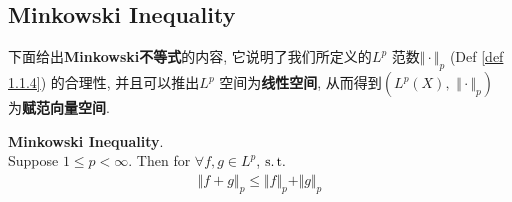  \newpage
 
 \subsection{Minkowski Inequality}
 	下面给出\textbf{Minkowski不等式}的内容, 它说明了我们所定义的$L^p$ 范数$\Vert \cdot \Vert_p$ (Def \ref{def 1.1.4}) 的合理性, 并且可以推出$L^p$ 空间为\textbf{线性空间}, 从而得到$(L^p(X) , \,\, \Vert \cdot \Vert_p)$ 为\textbf{赋范向量空间}.
 	\begin{thm}\label{thm 1.1.4}
 		\textbf{Minkowski Inequality}. \\
 		Suppose $1 \leq p < \infty$. Then for $\forall f , g \in L^p$, $\operatorname{s.t.}$
 		\begin{align}
 			\Vert f + g \Vert_p \leq \Vert f \Vert_p + \Vert g \Vert_p
 		\end{align}
 		

\end{thm}
